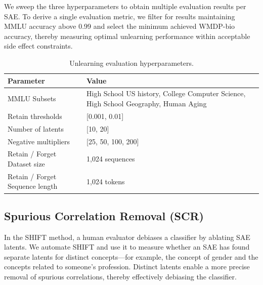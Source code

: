 \documentclass{article}
\theoremstyle{plain}
\theoremstyle{definition}
\theoremstyle{remark}
\begin{document}
We sweep the three hyperparameters to obtain multiple evaluation results per SAE. To derive a single evaluation metric, we filter for results maintaining MMLU accuracy above 0.99 and select the minimum achieved WMDP-bio accuracy, thereby measuring optimal unlearning performance within acceptable side effect constraints.

\begin{table}[h!]
    \centering
    \begin{tabular}{|l|l|}
        \hline
        \textbf{Parameter}             & \textbf{Value}                  \\ \hline
        MMLU Subsets                & High School US history, \newline 
                                         College Computer Science, \newline
                                         High School Geography, \newline
                                         Human Aging                      \\ \hline
        Retain thresholds              & [0.001, 0.01]                   \\ \hline
        Number of latents             & [10, 20]                        \\ \hline
        Negative multipliers           & [25, 50, 100, 200]              \\ \hline
        Retain / Forget Dataset size   & 1,024 sequences                 \\ \hline
        Retain / Forget Sequence length                & 1,024 tokens                    \\ \hline
    \end{tabular}
    \caption{Unlearning evaluation hyperparameters.}
    \label{tab:unlearning-parameters}
\end{table}


\subsection*{Spurious Correlation Removal (SCR)}

In the SHIFT method, a human evaluator debiases a classifier by ablating SAE latents. We automate SHIFT and use it to measure whether an SAE has found separate latents for distinct concepts—for example, the concept of gender and the concepts related to someone's profession. Distinct latents enable a more precise removal of spurious correlations, thereby effectively debiasing the classifier.
\end{document}
